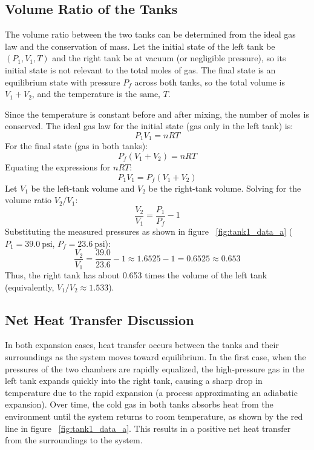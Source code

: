 \documentclass[12pt]{article}
\begin{document}
\subsection*{Volume Ratio of the Tanks}
The volume ratio between the two tanks can be determined from the ideal gas law and the conservation of mass. Let the initial state of the left tank be $(P_1, V_1, T)$ and the right tank be at vacuum (or negligible pressure), so its initial state is not relevant to the total moles of gas. The final state is an equilibrium state with pressure $P_f$ across both tanks, so the total volume is $V_1 + V_2$, and the temperature is the same, $T$.

Since the temperature is constant before and after mixing, the number of moles is conserved. The ideal gas law for the initial state (gas only in the left tank) is:
\[ P_1 V_1 = n R T \]
For the final state (gas in both tanks):
\[ P_f (V_1 + V_2) = n R T \]
Equating the expressions for $nRT$:
\[ P_1 V_1 = P_f (V_1 + V_2) \]
Let $V_1$ be the left-tank volume and $V_2$ be the right-tank volume. Solving for the volume ratio $V_2/V_1$:
\[ \frac{V_2}{V_1} = \frac{P_1}{P_f} - 1 \]
Substituting the measured pressures as shown in figure ~\ref{fig:tank1_data_a} ($P_1 = 39.0~\text{psi}$, $P_f = 23.6~\text{psi}$):
\[ \frac{V_2}{V_1} = \frac{39.0}{23.6} - 1 \approx 1.6525 - 1 = 0.6525 \approx 0.653 \]
Thus, the right tank has about 0.653 times the volume of the left tank (equivalently, $V_1/V_2 \approx 1.533$).

\subsection*{Net Heat Transfer Discussion}
In both expansion cases, heat transfer occurs between the tanks and their surroundings as the system moves toward equilibrium. In the first case, when the pressures of the two chambers are rapidly equalized, the high-pressure gas in the left tank expands quickly into the right tank, causing a sharp drop in temperature due to the rapid expansion (a process approximating an adiabatic expansion). Over time, the cold gas in both tanks absorbs heat from the environment until the system returns to room temperature, as shown by the red line in figure ~\ref{fig:tank1_data_a}. This results in a positive net heat transfer from the surroundings to the system.
\end{document}
